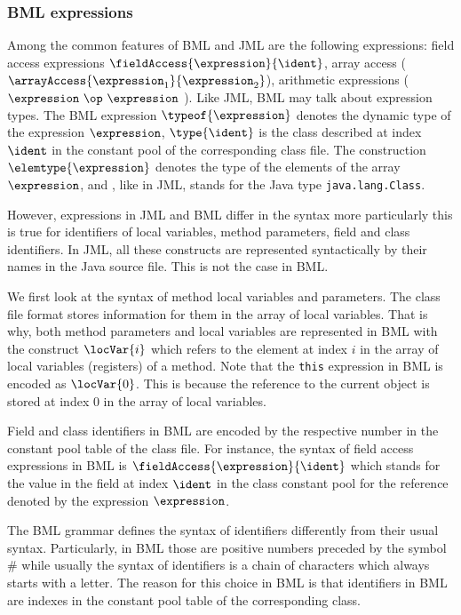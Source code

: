 \subsubsection{BML expressions}
Among the common features of BML and JML are the following expressions:
field access expressions $\fieldAccess{ \expression}{\ident}$, array access  
($\arrayAccess{\expression_1} {\expression_2} $),  arithmetic expressions
($\expression \ \op \ \expression$ ). Like JML, BML may talk about expression types.
The BML expression  $ \typeof{\expression}$  denotes the dynamic type of the expression $\expression$, 
 $ \type{ \ident } $  is the class  described at index $\ident$ in the constant pool of the corresponding class file.
The construction $\elemtype{\expression}$ denotes the type of the elements of the array $\expression$,
and \TYPE, like in JML, stands for the Java type \texttt{java.lang.Class}. 

However, expressions in JML and BML differ in the syntax more particularly this is true for identifiers 
of local variables, method parameters, field and class identifiers. In JML, all these constructs
 are represented syntactically by their names in the Java source file. This is not the case in BML.

 We first look at the syntax of method local variables and parameters.
 The class file format stores information for them in the array of local variables.
 That is why, both method parameters and local variables are represented in BML 
 with the construct  $\locVar{i}$ which refers to the element at index $i$ in the array of local
 variables (registers) of a method. Note that the \texttt{this} expression in BML is encoded
 as $\locVar{0}$. This is because the reference to the current object is stored at index 0 in the array of local variables.

 
 Field and class identifiers in BML are encoded by the respective number in the constant pool table of the class file.
 For instance, the syntax of field access expressions  in BML is $\fieldAccess{\expression}{\ident}$ which 
 stands for the value in the field at index $\ident$ in the class constant pool 
 for the reference denoted by the expression  $ \expression $. 

 The BML grammar defines the syntax of identifiers differently from their usual syntax.
 Particularly, in BML those are positive numbers preceded by the symbol \# while usually
 the syntax of identifiers is a chain of characters which always starts with a letter. 
 The reason for this choice in BML  is that identifiers in BML are indexes in the constant
 pool table of the corresponding class.     

